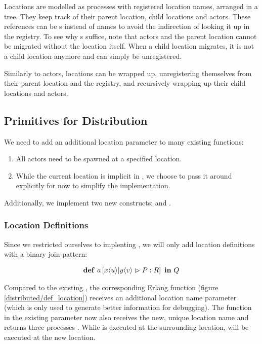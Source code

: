 Locations are modelled as processes with registered location names,
arranged in a tree.
They keep track of their parent location, child locations and actors.
These references can be \PID{}s instead of names
to avoid the indirection of looking it up in the registry.
To see why \PID{}s suffice, note that actors and the parent location
cannot be migrated without the location itself.
When a child location migrates, it is not a child location anymore and can
simply be unregistered.

Similarly to actors, locations can be wrapped up,
unregistering themselves from their parent location and the registry,
and recursively wrapping up their child locations and actors.



\subsection{Primitives for Distribution}

We need to add an additional location parameter to many existing functions:
\begin{enumerate}[nosep]
  \item
    All actors need to be spawned at a specified location.
  \item
    While the current location is implicit in \distjoincalc,
    we choose to pass it around explicitly for now
    to simplify the implementation.
\end{enumerate}

Additionally, we implement two new constructs:
 and .

\subsubsection{Location Definitions}
Since we restricted ourselves to implenting \corejoincalc,
we will only add location definitions with a binary join-pattern:

\begin{align*}
  \textbf{\textup{def}} \ a \left[ x\langle u\rangle | y\langle v\rangle \vartriangleright P : R \right] \ \textbf{\textup{in}} \ Q
\end{align*}

Compared to the existing ,
the corresponding Erlang function 
(figure \ref{distributed/def_location})
receives an additional location name parameter
(which is only used to generate better information for debugging).
The function in the existing parameter now also receives the new,
unique location name and returns three processes .
While  is executed at the surrounding location,
 will be executed at the new location.


